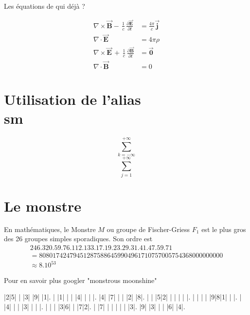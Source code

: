 \documentclass[twocolumn,a4paper]{IEEEtranfr}
\newcommand{\sm}[1]{\sum_{#1=-\infty}^{+\infty}}
\newcommand{\smr}[3]{\sum_{#1=#2}^{#3}}
\begin{document}
Les équations de qui déjà ?

\begin{equation}
\begin{aligned}
    \nabla \times \vec{\mathbf{B}} -\, \frac1c\,
    \frac{\partial\vec{\mathbf{E}}}{\partial t} & = \frac{4\pi}{c}\vec{\mathbf{j}} \\  
    \nabla \cdot \vec{\mathbf{E}} & = 4 \pi \rho \\
    \nabla \times \vec{\mathbf{E}}\, +\, \frac1c\,
    \frac{\partial\vec{\mathbf{B}}}{\partial t} & = \vec{\mathbf{0}} \\
    \nabla \cdot \vec{\mathbf{B}} & = 0
\end{aligned}
\end{equation}
\section{Utilisation de l'alias \\sm}
$$\sm{k}$$
$$\smr{j}{1}{+\infty}$$
\section{Le monstre}
En mathématiques, le Monstre $M$ ou groupe de Fischer-Griess $F_1$ est le plus gros des 26 groupes simples sporadiques. Son ordre est
\begin{eqnarray*}
246.320.59.76.112.133.17.19.23.29.31.41.47.59.71 \\
= 808 017 424 794 512 875 886 459 904 961 710 757 005 754 368 000 000 000 \\
\approx 8.10^{53}
\end{eqnarray*}

Pour en savoir plus googler "monstrous moonshine"
\begin{sudoku}
|2|5| | |3| |9| |1|.
| |1| | | |4| | | |.
|4| |7| | | |2| |8|.
| | |5|2| | | | | |.
| | | | |9|8|1| | |.
| |4| | | |3| | | |.
| | | |3|6| | |7|2|.
| |7| | | | | | |3|.
|9| |3| | | |6| |4|.
\end{sudoku}
\end{document}
